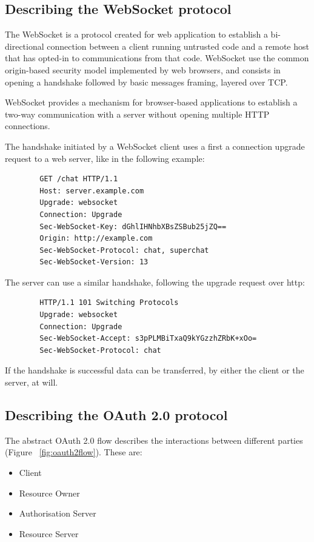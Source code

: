 \subsection{Describing the WebSocket protocol}

The WebSocket is a protocol created for web application to establish a bi-directional connection between a client running untrusted code and a remote host that has opted-in to communications from that code. 
WebSocket use the common origin-based security model implemented by web browsers, and consists in opening a handshake followed by basic messages framing, layered over TCP.

WebSocket provides a mechanism for browser-based applications to establish a two-way communication with a server without opening multiple HTTP connections.

The handshake initiated by a WebSocket client uses a first a connection upgrade request to a web server, like in the following example:

\begin{lstlisting}
        GET /chat HTTP/1.1
        Host: server.example.com
        Upgrade: websocket
        Connection: Upgrade
        Sec-WebSocket-Key: dGhlIHNhbXBsZSBub25jZQ==
        Origin: http://example.com
        Sec-WebSocket-Protocol: chat, superchat
        Sec-WebSocket-Version: 13
\end{lstlisting}

The server can use a similar handshake, following the upgrade request over http:

\begin{lstlisting}
        HTTP/1.1 101 Switching Protocols
        Upgrade: websocket
        Connection: Upgrade
        Sec-WebSocket-Accept: s3pPLMBiTxaQ9kYGzzhZRbK+xOo=
        Sec-WebSocket-Protocol: chat
\end{lstlisting}

If the handshake is successful data can be transferred, by either the client or the server, at will.

\subsection{Describing the OAuth 2.0 protocol}

The abstract OAuth 2.0 flow describes the interactions between different parties (Figure ~\ref{fig:oauth2flow}). These are:

\begin{itemize}
    \item Client
    \item Resource Owner
    \item Authorisation Server
    \item Resource Server
\end{itemize}

